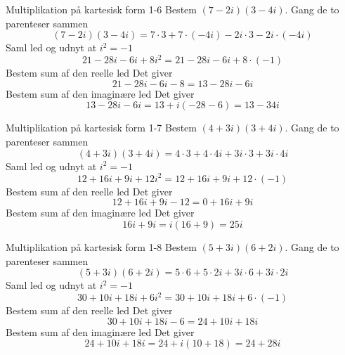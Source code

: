 \documentclass{article}
\begin{document}
\newpage
\begin{exercise}{Multiplikation på kartesisk form 1-6}
Bestem $(7 - 2i)(3 - 4i)$.
\hint
Gang de to parenteser sammen
\[(7 - 2i)(3 - 4i) = 7 \cdot 3 + 7 \cdot (-4i) - 2i \cdot 3 - 2i \cdot (-4i)
\]
\hint
Saml led og udnyt at $i^2 = - 1$
\[21 - 28i - 6i + 8i^2 = 21 - 28i - 6i + 8 \cdot (-1)
\]
\hint
Bestem sum af den reelle led
\hint
Det giver
\[21 - 28i - 6i - 8 = 13 - 28i - 6i
\]
\hint
Bestem sum af den imaginære led
\hint
Det giver
\[13 - 28i - 6i = 13 + i(-28 - 6) = 13 - 34i
\]
\end{exercise}
\newpage
\begin{exercise}{Multiplikation på kartesisk form 1-7}
Bestem $(4 + 3i)(3 + 4i)$.
\hint
Gang de to parenteser sammen
\[(4 + 3i)(3 + 4i) = 4 \cdot 3 + 4 \cdot 4i + 3i \cdot 3 + 3i \cdot 4i
\]
\hint
Saml led og udnyt at $i^2 = - 1$
\[12 + 16i + 9i + 12i^2 = 12 + 16i + 9i + 12 \cdot (-1)
\]
\hint
Bestem sum af den reelle led
\hint
Det giver
\[12 + 16i + 9i - 12 = 0 + 16i + 9i
\]
\hint
Bestem sum af den imaginære led
\hint
Det giver
\[16i + 9i = i(16 + 9) = 25i
\]
\end{exercise}
\newpage
\begin{exercise}{Multiplikation på kartesisk form 1-8}
Bestem $(5 + 3i)(6 + 2i)$.
\hint
Gang de to parenteser sammen
\[(5 + 3i)(6 + 2i) = 5 \cdot 6 + 5 \cdot 2i + 3i \cdot 6 + 3i \cdot 2i
\]
\hint
Saml led og udnyt at $i^2 = - 1$
\[30 + 10i + 18i + 6i^2 = 30 + 10i + 18i + 6 \cdot (-1)
\]
\hint
Bestem sum af den reelle led
\hint
Det giver
\[30 + 10i + 18i - 6 = 24 + 10i + 18i
\]
\hint
Bestem sum af den imaginære led
\hint
Det giver
\[24 + 10i + 18i = 24 + i(10 + 18) = 24 + 28i
\]
\end{exercise}
\end{document}
